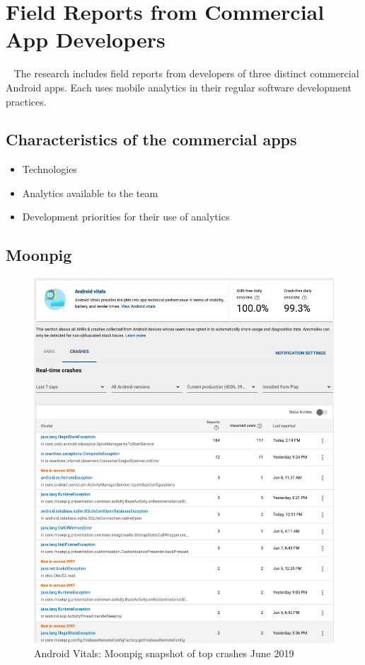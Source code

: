 \section{Field Reports from Commercial App Developers}~\label{section-field-reports-case-studies}
The research includes field reports from developers of three distinct commercial Android apps. Each uses mobile analytics in their regular software development practices.

\subsection{Characteristics of the commercial apps}

\begin{itemize}
    \item Technologies
    \item Analytics available to the team
    \item Development priorities for their use of analytics
\end{itemize}

\subsection{Moonpig}

\begin{figure}
    \centering
    \includegraphics[width=13cm]{images/android-vitals-screenshots/moonpig/real-time-crashes-Screenshot-2019-06-10-at-15.42.34.png}
    \caption{Android Vitals: Moonpig snapshot of top crashes  June 2019}
    \label{fig:av-moonpig-top-real-time-crashes-10-jun-2019}
\end{figure}

